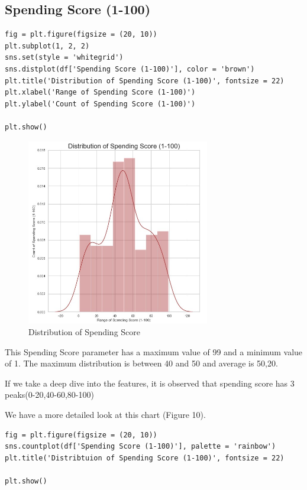 \documentclass{article}
\begin{document}
\subsection{Spending Score (1-100)}

\begin{lstlisting}
fig = plt.figure(figsize = (20, 10))
plt.subplot(1, 2, 2)
sns.set(style = 'whitegrid')
sns.distplot(df['Spending Score (1-100)'], color = 'brown')
plt.title('Distribution of Spending Score (1-100)', fontsize = 22)
plt.xlabel('Range of Spending Score (1-100)')
plt.ylabel('Count of Spending Score (1-100)')

plt.show()
\end{lstlisting}

\begin{figure}[htp]
    \centering
    \includegraphics[width=8cm]{Spending Score.jpg}
    \caption{Distribution of Spending Score}
    \label{fig:Distribution of Spending Score}
\end{figure}


This Spending Score parameter has a maximum value of 99 and a minimum value of 1. The maximum distribution is between 40 and 50 and average is 50,20.

If we take a deep dive into the features, it is observed that spending score has 3 peaks(0-20,40-60,80-100)
\vspace{7cm}


We have a more detailed look at this chart (Figure 10).
\begin{lstlisting}
fig = plt.figure(figsize = (20, 10))
sns.countplot(df['Spending Score (1-100)'], palette = 'rainbow')
plt.title('Distribtuion of Spending Score (1-100)', fontsize = 22)

plt.show()
\end{lstlisting}
\end{document}
